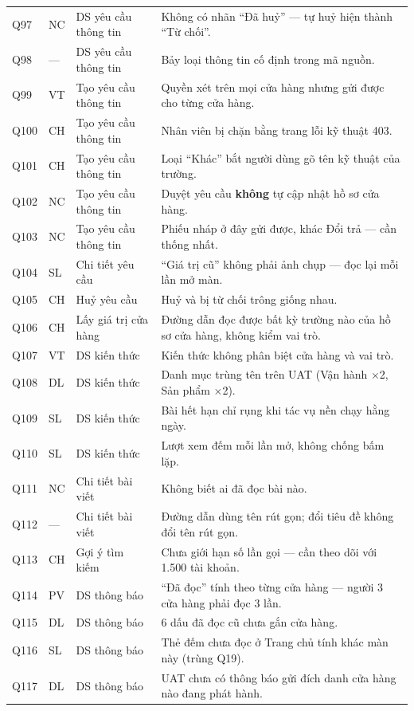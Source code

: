 {\begin{longtable}{@{}L{0.8cm}L{1.1cm}L{3.4cm}L{9.4cm}@{}}
Q97 & NC & DS yêu cầu thông tin & Không có nhãn ``Đã huỷ'' --- tự huỷ hiện thành ``Từ chối''. \\
Q98 & --- & DS yêu cầu thông tin & Bảy loại thông tin cố định trong mã nguồn. \\
Q99 & VT & Tạo yêu cầu thông tin & Quyền xét trên mọi cửa hàng nhưng gửi được cho từng cửa hàng. \\
Q100 & CH & Tạo yêu cầu thông tin & Nhân viên bị chặn bằng trang lỗi kỹ thuật 403. \\
Q101 & CH & Tạo yêu cầu thông tin & Loại ``Khác'' bắt người dùng gõ tên kỹ thuật của trường. \\
Q102 & NC & Tạo yêu cầu thông tin & Duyệt yêu cầu \textbf{không} tự cập nhật hồ sơ cửa hàng. \\
Q103 & NC & Tạo yêu cầu thông tin & Phiếu nháp ở đây gửi được, khác Đổi trả --- cần thống nhất. \\
Q104 & SL & Chi tiết yêu cầu & ``Giá trị cũ'' không phải ảnh chụp --- đọc lại mỗi lần mở màn. \\
Q105 & CH & Huỷ yêu cầu & Huỷ và bị từ chối trông giống nhau. \\
Q106 & CH & Lấy giá trị cửa hàng & Đường dẫn đọc được bất kỳ trường nào của hồ sơ cửa hàng, không kiểm vai trò. \\
Q107 & VT & DS kiến thức & Kiến thức không phân biệt cửa hàng và vai trò. \\
Q108 & DL & DS kiến thức & Danh mục trùng tên trên UAT (Vận hành ×2, Sản phẩm ×2). \\
Q109 & SL & DS kiến thức & Bài hết hạn chỉ rụng khi tác vụ nền chạy hằng ngày. \\
Q110 & SL & DS kiến thức & Lượt xem đếm mỗi lần mở, không chống bấm lặp. \\
Q111 & NC & Chi tiết bài viết & Không biết ai đã đọc bài nào. \\
Q112 & --- & Chi tiết bài viết & Đường dẫn dùng tên rút gọn; đổi tiêu đề không đổi tên rút gọn. \\
Q113 & CH & Gợi ý tìm kiếm & Chưa giới hạn số lần gọi --- cần theo dõi với 1.500 tài khoản. \\
Q114 & PV & DS thông báo & ``Đã đọc'' tính theo từng cửa hàng --- người 3 cửa hàng phải đọc 3 lần. \\
Q115 & DL & DS thông báo & 6 dấu đã đọc cũ chưa gắn cửa hàng. \\
Q116 & SL & DS thông báo & Thẻ đếm chưa đọc ở Trang chủ tính khác màn này (trùng Q19). \\
Q117 & DL & DS thông báo & UAT chưa có thông báo gửi đích danh cửa hàng nào đang phát hành. \\

\end{longtable}}
